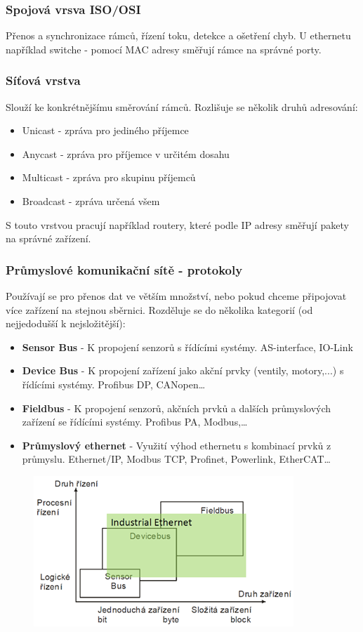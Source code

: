 \subsubsection*{Spojová vrsva ISO/OSI}
Přenos a synchronizace rámců, řízení toku, detekce a ošetření chyb. U ethernetu například switche - pomocí MAC adresy směřují rámce na správné porty.

\subsubsection*{Síťová vrstva}
Slouží ke konkrétnějšímu směrování rámců. Rozlišuje se několik druhů adresování:
\begin{itemize}
    \item Unicast - zpráva pro jediného příjemce
    \item Anycast - zpráva pro příjemce v určitém dosahu
    \item Multicast - zpráva pro skupinu příjemců
    \item Broadcast - zpráva určená všem
\end{itemize}
S touto vrstvou pracují například routery, které podle IP adresy směřují pakety na správné zařízení.

\subsubsection*{Průmyslové komunikační sítě - protokoly}
Používají se pro přenos dat ve větším množství, nebo pokud chceme připojovat více zařízení na stejnou sběrnici.
Rozděluje se do několika kategorií (od nejjedodušší k nejsložitější):
\begin{itemize}
    \item \textbf{Sensor Bus} - K propojení senzorů s řídícími systémy. AS-interface, IO-Link
    \item \textbf{Device Bus} - K propojení zařízení jako akční prvky (ventily, motory,...) s řídícími systémy. Profibus DP, CANopen\dots
    \item \textbf{Fieldbus} - K propojení senzorů, akčních prvků a dalších průmyslových zařízení se řídícími systémy. Profibus PA, Modbus,\dots
    \item \textbf{Průmyslový ethernet} - Využití výhod ethernetu s kombinací prvků z průmyslu. Ethernet/IP, Modbus TCP, Profinet, Powerlink, EtherCAT\dots
\end{itemize}

\begin{figure}[h]
    \begin{center}
        \includegraphics[scale = 1]{img/Picture17.png}
    \end{center}
\end{figure}

